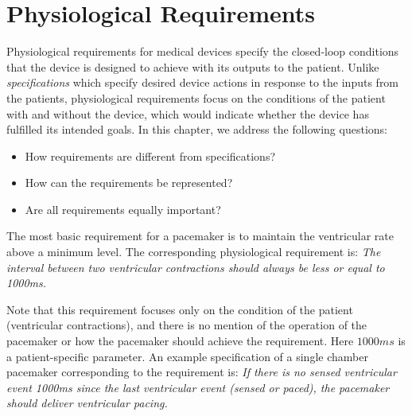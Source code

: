 \chapter{Physiological Requirements}

Physiological requirements for medical devices specify the closed-loop conditions that the device is designed to achieve with its outputs to the patient. Unlike \emph{specifications} which specify desired device actions in response to the inputs from the patients, physiological requirements focus on the conditions of the patient with and without the device, which would indicate whether the device has fulfilled its intended goals. In this chapter, we address the following questions:
\begin{itemize}
	\vspace{-5pt}
	\item How requirements are different from specifications?
	\vspace{-5pt}
 	\item How can the requirements be represented?
	\vspace{-5pt}
	\item Are all requirements equally important?
\end{itemize}


The most basic requirement for a pacemaker is to maintain the ventricular rate above a minimum level. The corresponding physiological requirement is:
\noindent
 \emph{The interval between two ventricular contractions should always be less or equal to 1000ms.} 

Note that this requirement focuses only on the condition of the patient (ventricular contractions), and there is no mention of the operation of the pacemaker or how the pacemaker should achieve the requirement. Here $1000ms$ is a patient-specific parameter. An example specification of a single chamber pacemaker corresponding to the requirement is:  
\noindent
\emph{If there is no sensed ventricular event 1000ms since the last ventricular event (sensed or paced), the pacemaker should deliver ventricular pacing.}
 
